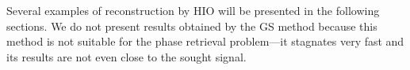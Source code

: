 Several examples of reconstruction by HIO will be presented in the
following sections. We do not present results obtained by the GS
method because this method is not suitable for the phase retrieval
problem---it stagnates very fast and its results are not even close to
the sought signal.



